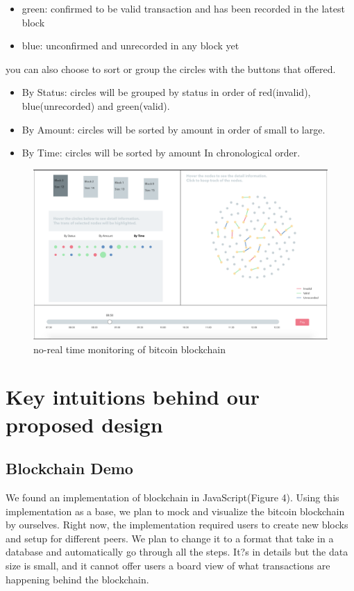 \documentclass[journal, a4paper]{IEEEtran}
\begin{document}
\begin{itemize}
\begin{itemize}
        \item green: confirmed to be valid transaction and has been recorded in the latest block
        \item blue: unconfirmed and unrecorded in any block yet
    \end{itemize}
    you can also choose to sort or group the circles with the buttons that offered.
    \begin{itemize}
        \item By Status: circles will be grouped by status in order of red(invalid), blue(unrecorded) and green(valid).
        \item By Amount: circles will be sorted by amount in order of small to large.
        \item By Time: circles will be sorted by amount In chronological order. 
    \end{itemize}
\end{itemize}

\begin{figure}[!hbt]
		\begin{center}
		\includegraphics[width=\columnwidth]{overall_design.png}
		\caption{no-real time monitoring of bitcoin blockchain}
		\label{fig:overall_design}
		\end{center}
	\end{figure}

\section{Key intuitions behind our proposed design}
\subsection{Blockchain Demo}
We found an implementation of blockchain in JavaScript(Figure 4). Using this implementation as a base, we plan to mock and visualize the bitcoin blockchain by ourselves. Right now, the implementation required users to create new blocks and setup for different peers. We plan to change it to a format that take in a database and automatically go through all the steps. It?s in details but the data size is small, and it cannot offer users a board view of what transactions are happening behind the blockchain.
\end{document}
